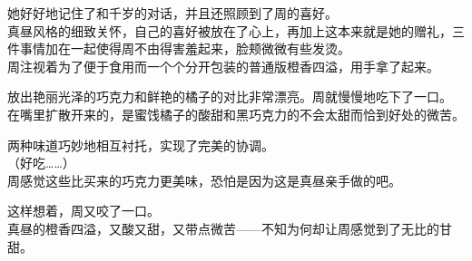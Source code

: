 她好好地记住了和千岁的对话，并且还照顾到了周的喜好。\\

真昼风格的细致关怀，自己的喜好被放在了心上，再加上这本来就是她的赠礼，三件事情加在一起使得周不由得害羞起来，脸颊微微有些发烫。\\

周注视着为了便于食用而一个个分开包装的普通版橙香四溢，用手拿了起来。

放出艳丽光泽的巧克力和鲜艳的橘子的对比非常漂亮。周就慢慢地吃下了一口。\\

在嘴里扩散开来的，是蜜饯橘子的酸甜和黑巧克力的不会太甜而恰到好处的微苦。

两种味道巧妙地相互衬托，实现了完美的协调。\\

（好吃……）\\

周感觉这些比买来的巧克力更美味，恐怕是因为这是真昼亲手做的吧。

这样想着，周又咬了一口。\\

真昼的橙香四溢，又酸又甜，又带点微苦——不知为何却让周感觉到了无比的甘甜。
